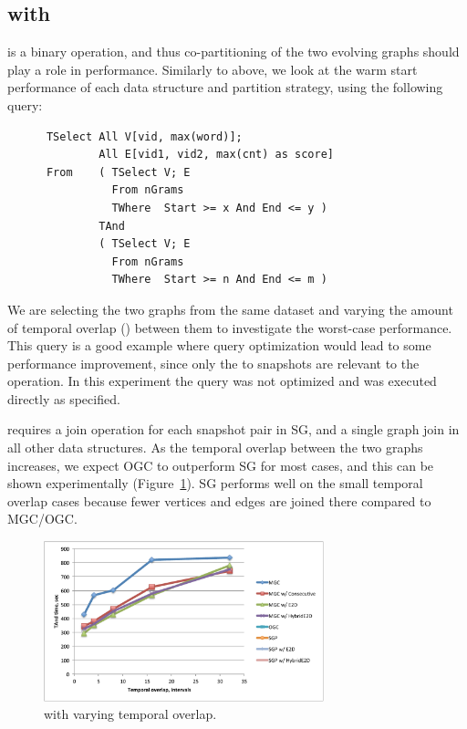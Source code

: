 \subsection{ with }

 is a binary operation, and thus co-partitioning of the
two evolving graphs should play a role in performance.  Similarly to
 above, we look at the warm start performance of each
data structure and partition strategy, using the following query:

\begin{small}
\begin{verbatim}
      TSelect All V[vid, max(word)];
              All E[vid1, vid2, max(cnt) as score]
      From    ( TSelect V; E
                From nGrams
                TWhere  Start >= x And End <= y )
              TAnd
              ( TSelect V; E
                From nGrams
                TWhere  Start >= n And End <= m )      
\end{verbatim}
\end{small}

We are selecting the two graphs from the same dataset and varying the
amount of temporal overlap () between them to investigate
the worst-case performance.  This query is a good example where query
optimization would lead to some performance improvement, since only
the  to  snapshots are relevant to the operation.
In this experiment the query was not optimized and was executed
directly as specified.

 requires a join operation for each snapshot pair in SG,
and a single graph join in all other data structures.  As the temporal
overlap between the two graphs increases, we expect OGC to outperform
SG for most cases, and this can be shown experimentally
(Figure~\ref{fig:tandall}).  SG performs well on the small temporal
overlap cases because fewer vertices and edges are joined there
compared to MGC/OGC.

\begin{figure}[t!]
\includegraphics[width=3.2in]{figs/tand_all_warm.pdf}
\caption{ with varying temporal overlap.}
\label{fig:tandall}
\end{figure}

